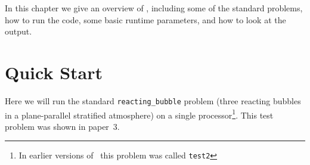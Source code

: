 

In this chapter we give an overview of \maestro, including some of the
standard problems, how to run the code, some basic runtime parameters,
and how to look at the output.

\section{Quick Start}

Here we will run the standard {\tt reacting\_bubble} problem (three
reacting bubbles in a plane-parallel stratified atmosphere) on a
single processor\footnote{In earlier versions of \maestro\ this
problem was called {\tt test2}}.  This test problem was shown in
paper~3.

